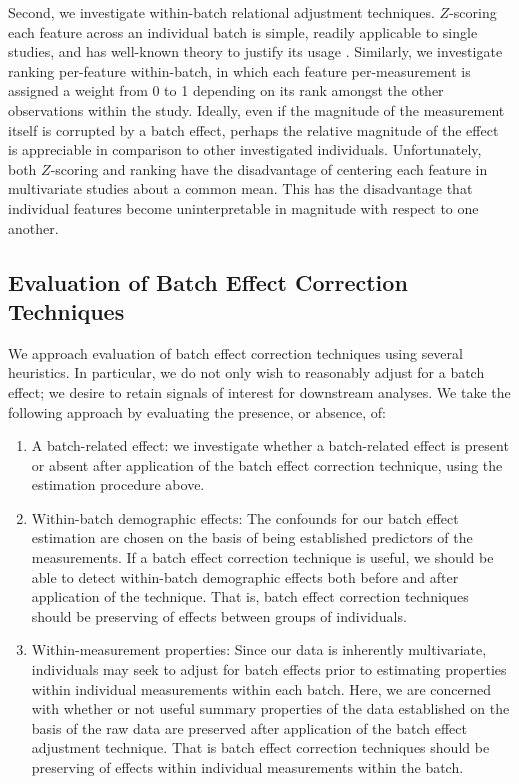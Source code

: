 Second, we investigate within-batch relational adjustment techniques. $Z$-scoring each feature across an individual batch is simple, readily applicable to single studies, and has well-known theory to justify its usage \cite{Lazar2013Jul}. Similarly, we investigate ranking per-feature within-batch, in which each feature per-measurement is assigned a weight from 0 to 1 depending on its rank amongst the other observations within the study. Ideally, even if the magnitude of the measurement itself is corrupted by a batch effect, perhaps the relative magnitude of the effect is appreciable in comparison to other investigated individuals. Unfortunately, both $Z$-scoring and ranking have the disadvantage of centering each feature in multivariate studies about a common mean. This has the disadvantage that individual features become uninterpretable in magnitude with respect to one another.

\subsection{Evaluation of Batch Effect Correction Techniques} We approach evaluation of batch effect correction techniques using several heuristics. In particular, we do not only wish to reasonably adjust for a batch effect; we desire to retain signals of interest for downstream analyses. We take the following approach by evaluating the presence, or absence, of:
\begin{enumerate}
    \item A batch-related effect: we investigate whether a batch-related effect is present or absent after application of the batch effect correction technique, using the estimation procedure above.
    \item Within-batch demographic effects: The confounds for our batch effect estimation are chosen on the basis of being established predictors of the measurements. If a batch effect correction technique is useful, we should be able to detect within-batch demographic effects both before and after application of the technique. That is, batch effect correction techniques should be preserving of effects between groups of individuals.
    \item Within-measurement properties: Since our data is inherently multivariate, individuals may seek to adjust for batch effects prior to estimating properties within individual measurements within each batch. Here, we are concerned with whether or not useful summary properties of the data established on the basis of the raw data are preserved after application of the batch effect adjustment technique. That is batch effect correction techniques should be preserving of effects within individual measurements within the batch.
\end{enumerate}




